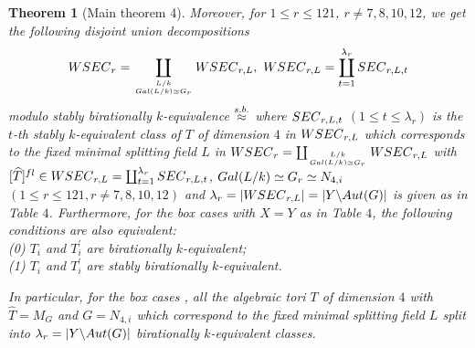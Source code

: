 \documentclass[10pt,a4paper]{amsart}
\newtheorem{theorem}{Theorem}
\begin{document}
\begin{theorem}[Main theorem 4]
Moreover, for $1\leq r\leq 121$, $r\neq 7,8,10,12$, 
we get the following disjoint union decompositions 
\begin{align*}
{\rm WSEC}_r=\coprod_{L/k\atop {\rm Gal}(L/k)\simeq {\rm G}_r}
{\rm WSEC}_{r,L},\ 
{\rm WSEC}_{r,L}=
\coprod_{t=1}^{\lambda_{r}} {\rm SEC}_{r,L,t}
\end{align*}
modulo stably birationally $k$-equivalence $\stackrel{\rm s.b.}{\approx}$ 
where 
${\rm SEC}_{r,L,t}$ $(1\leq t\leq \lambda_{r})$ is the $t$-th 
stably $k$-equivalent class of $T$ of dimension $4$ in 
${\rm WSEC}_{r,L}$ which corresponds to the fixed minimal splitting field $L$ 
in 
${\rm WSEC}_r=\coprod_{L/k\atop {\rm Gal}(L/k)\simeq {\rm G}_r} {\rm WSEC}_{r,L}$ 
with 
$[\widehat{T}]^{fl}\in {\rm WSEC}_{r,L}
=\coprod_{t=1}^{\lambda_r} {\rm SEC}_{r,L,t}$, 
${\rm Gal}(L/k)\simeq {\rm G}_r\simeq N_{4,i}$ 
$(1\leq r\leq 121, r\neq 7,8,10,12)$ and 
$\lambda_r=|{\rm WSEC}_{r,L}|=|Y\backslash {\rm Aut}(G)|$ 
is given as in Table $4$. 
%
Furthermore, 
for the box cases  with $X=Y$ as in Table $4$,
the following conditions are also equivalent:\\
{\rm (0)} $T_i$ and $T_i^\prime$ are birationally $k$-equivalent;\\
{\rm (1)} $T_i$ and $T_i^\prime$ are stably birationally $k$-equivalent. 

In particular, for the box cases , 
all the algebraic tori $T$ of dimension $4$ 
with $\widehat{T}=M_G$ and $G=N_{4,i}$ 
which correspond to the fixed minimal splitting field $L$ 
split into 
$\lambda_r=|Y\backslash {\rm Aut}(G)|$ birationally $k$-equivalent classes. 
\end{theorem}
\end{document}
